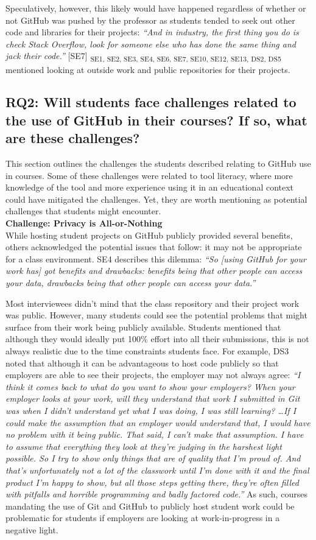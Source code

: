 Speculatively, however, this likely would have happened regardless of whether or not GitHub was pushed by the professor as students tended to seek out other code and libraries for their projects: \textit{``And in industry, the first thing you do is check Stack Overflow, look for someone else who has done the same thing and jack their code.''} [SE7] \textsubscript{SE1, SE2, SE3, SE4, SE6, SE7, SE10, SE12, SE13, DS2, DS5} mentioned looking at outside work and public repositories for their projects.

\subsection{RQ2: Will students face challenges related to the use of GitHub in their courses? If so, what are these challenges?}
This section outlines the challenges the students described relating to GitHub use in courses. Some of these challenges were related to tool literacy, where more knowledge of the tool and more experience using it in an educational context could have mitigated the challenges. Yet, they are worth mentioning as potential challenges that students might encounter. \\

\textbf{Challenge: Privacy is All-or-Nothing} \\
While hosting student projects on GitHub publicly provided several benefits, others acknowledged the potential issues that follow: it may not be appropriate for a class environment. SE4 describes this dilemma: \textit{``So [using GitHub for your work has] got benefits and drawbacks: benefits being that other people can access your data, drawbacks being that other people can access your data.''}

Most interviewees didn't mind that the class repository and their project work was public. However, many students could see the potential problems that might surface from their work being publicly available. Students mentioned that although they would ideally put 100\% effort into all their submissions, this is not always realistic due to the time constraints students face. For example, DS3 noted that although it can be advantageous to host code publicly so that employers are able to see their projects, the employer may not always agree: \textit{``I think it comes back to what do you want to show your employers? When your employer looks at your work, will they understand that work I submitted in Git was when I didn't understand yet what I was doing, I was still learning? \ldots If I could make the assumption that an employer would understand that, I would have no problem with it being public. That said, I can't make that assumption. I have to assume that everything they look at they're judging in the harshest light possible. So I try to show only things that are of quality that I'm proud of. And that's unfortunately not a lot of the classwork until I'm done with it and the final product I'm happy to show, but all those steps getting there, they're often filled with pitfalls and horrible programming and badly factored code.''} As such, courses mandating the use of Git and GitHub to publicly host student work could be problematic for students if employers are looking at work-in-progress in a negative light.

